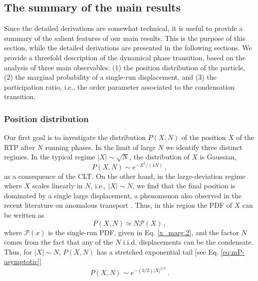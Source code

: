 \documentclass[aps,pre,twocolumn,superscriptaddress,showpacs]{revtex4-1}
\newcommand{\mP}{\mathcal{P}}
\begin{document}
\subsection{The summary of the main results}


Since the detailed derivations are somewhat technical, it is useful to provide a summary of the salient features of our main results. This is the purpose of this section, while the detailed derivations are presented in the following sections. We provide a threefold description of the dynamical phase transition, based on the analysis of three main observables: (1) the position distribution of the particle, (2) the marginal probability of a single-run displacement, and (3) the participation ratio, i.e., the order parameter associated to the condensation transition.


\subsubsection{Position distribution}

Our first goal is to investigate the distribution $P(X,N)$ of the position $X$ of the RTP after $N$ running phases. In the limit of large $N$ we identify three distinct regimes. In the typical regime $|X| \sim \sqrt{N}$, the distribution of $X$ is Gaussian,
\begin{equation}
P(X,N)\sim e^{-X^2/(4N)}\,,
\label{gaussian_tail}
\end{equation} 
as a consequence of the CLT. On the other hand, in the large-deviation regime where $X$ scales linearly in $N$, i.e., $|X|\sim N$, we find that the final position is dominated by a single large displacement, a phenomenon also observed in the recent literature on anomalous transport \cite{embrechts_book,VBB19,MPG20,HB21}. Thus, in this region the PDF of $X$ can be written as
\begin{equation}
P(X,N)\simeq N \mP(X)\,,
\end{equation}
where $\mP(x)$ is the single-run PDF, given in Eq. \eqref{x_marg.2}, and the factor $N$ comes from the fact that any of the $N$ i.i.d. displacements can be the condensate. Thus, for $|X|\sim N$, $P(X,N)$ has a stretched exponential tail [see Eq. \eqref{eq:mP-asymptotic}]
\begin{equation}
P(X,N)\sim e^{-(3/2)|X|^{2/3}}\,.
\label{stretched_tail}
\end{equation}
\end{document}

